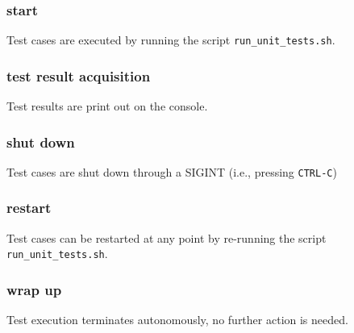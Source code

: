 \subsubsection{start}
Test cases are executed by running the script \texttt{run\_unit\_tests.sh}.
\subsubsection{test result acquisition}
Test results are print out on the console.
\subsubsection{shut down}
Test cases are shut down through a SIGINT (i.e., pressing \texttt{CTRL-C})
\subsubsection{restart}
Test cases can be restarted at any point by re-running the script \texttt{run\_unit\_tests.sh}.
\subsubsection{wrap up}
Test execution terminates autonomously, no further action is needed.
